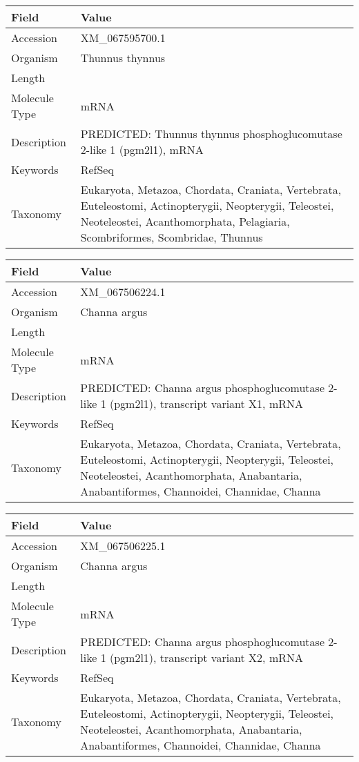 \documentclass[10pt]{article}
\begin{document}
\vspace{1em}
{\footnotesize
\begin{longtable}{>{\raggedright\arraybackslash}p{4.5cm} >{\raggedright\arraybackslash}p{11.5cm}}
\textbf{Field} & \textbf{Value} \\
\hline
Accession & XM\_067595700.1 \\
Organism & Thunnus thynnus \\
Length & 3745 \\
Molecule Type & mRNA \\
Description & PREDICTED: Thunnus thynnus phosphoglucomutase 2-like 1 (pgm2l1), mRNA \\
Keywords & RefSeq \\
Taxonomy & Eukaryota, Metazoa, Chordata, Craniata, Vertebrata, Euteleostomi, Actinopterygii, Neopterygii, Teleostei, Neoteleostei, Acanthomorphata, Pelagiaria, Scombriformes, Scombridae, Thunnus \\
\end{longtable}
}

\vspace{1em}
{\footnotesize
\begin{longtable}{>{\raggedright\arraybackslash}p{4.5cm} >{\raggedright\arraybackslash}p{11.5cm}}
\textbf{Field} & \textbf{Value} \\
\hline
Accession & XM\_067506224.1 \\
Organism & Channa argus \\
Length & 3894 \\
Molecule Type & mRNA \\
Description & PREDICTED: Channa argus phosphoglucomutase 2-like 1 (pgm2l1), transcript variant X1, mRNA \\
Keywords & RefSeq \\
Taxonomy & Eukaryota, Metazoa, Chordata, Craniata, Vertebrata, Euteleostomi, Actinopterygii, Neopterygii, Teleostei, Neoteleostei, Acanthomorphata, Anabantaria, Anabantiformes, Channoidei, Channidae, Channa \\
\end{longtable}
}

\vspace{1em}
{\footnotesize
\begin{longtable}{>{\raggedright\arraybackslash}p{4.5cm} >{\raggedright\arraybackslash}p{11.5cm}}
\textbf{Field} & \textbf{Value} \\
\hline
Accession & XM\_067506225.1 \\
Organism & Channa argus \\
Length & 7132 \\
Molecule Type & mRNA \\
Description & PREDICTED: Channa argus phosphoglucomutase 2-like 1 (pgm2l1), transcript variant X2, mRNA \\
Keywords & RefSeq \\
Taxonomy & Eukaryota, Metazoa, Chordata, Craniata, Vertebrata, Euteleostomi, Actinopterygii, Neopterygii, Teleostei, Neoteleostei, Acanthomorphata, Anabantaria, Anabantiformes, Channoidei, Channidae, Channa \\
\end{longtable}
}
\end{document}
